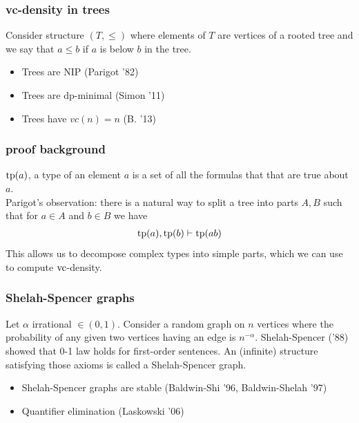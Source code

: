 \documentclass{beamer}
\begin{document}
\begin{frame}
	\frametitle{vc-density in trees}
	Consider structure $(T, \leq)$ where elements of $T$ are vertices of a rooted tree and we say that $a \leq b$ if $a$ is below $b$ in the tree.
	\begin{itemize}
		\item Trees are NIP (Parigot '82)
		\item Trees are dp-minimal (Simon '11)
		\item Trees have $vc(n) = n$ (B. '13)
	\end{itemize}
\end{frame}

\begin{frame}
	\frametitle{proof background}
	$\operatorname{tp}(a)$, a type of an element $a$ is a set of all the formulas that that are true about $a$.\\
	Parigot's observation: there is a natural way to split a tree into parts $A, B$ such that for $a \in A$ and $b \in B$ we have
	\begin{align*}
		\operatorname{tp}(a), \operatorname{tp}(b) \vdash \operatorname{tp}(ab)
	\end{align*}
	This allows us to decompose complex types into simple parts, which we can use to compute $\operatorname{vc}$-density.
\end{frame}

\begin{frame}
	\frametitle{Shelah-Spencer graphs}
	Let $\alpha$ irrational $\in (0,1)$. Consider a random graph on $n$ vertices where the probability of any given two vertices having an edge is $n^{-\alpha}$. Shelah-Spencer ('88) showed that 0-1 law holds for first-order sentences. An (infinite) structure satisfying those axioms is called a Shelah-Spencer graph.
	\begin{itemize}
		\item Shelah-Spencer graphs are stable (Baldwin-Shi '96, Baldwin-Shelah '97)
		\item Quantifier elimination (Laskowski '06)
	\end{itemize}
\end{frame}
\end{document}
